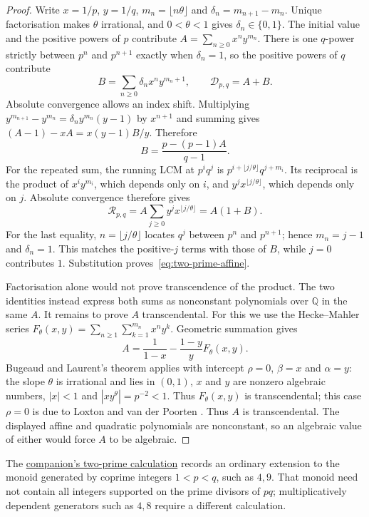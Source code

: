 \documentclass[11pt]{article}
\newcommand{\longrecord}[2]{\href{erdos269-running-lcm-reasoning-surface.pdf\##1}{#2}}
\begin{document}
\begin{proof}
Write $x=1/p$, $y=1/q$, $m_n=\lfloor n\theta\rfloor$ and
$\delta_n=m_{n+1}-m_n$.  Unique factorisation makes $\theta$ irrational,
and $0<\theta<1$ gives $\delta_n\in\{0,1\}$.  The initial value and the
positive powers of $p$ contribute $A=\sum_{n\ge0}x^ny^{m_n}$.  There is
one $q$-power strictly between $p^n$ and $p^{n+1}$ exactly when
$\delta_n=1$, so the positive powers of $q$ contribute
\[
 B=\sum_{n\ge0}\delta_nx^ny^{m_n+1},\qquad \mathcal D_{p,q}=A+B.
\]
Absolute convergence allows an index shift. Multiplying
$y^{m_{n+1}}-y^{m_n}=\delta_ny^{m_n}(y-1)$ by $x^{n+1}$ and summing gives
$(A-1)-xA=x(y-1)B/y$. Therefore
\[
 B=\frac{p-(p-1)A}{q-1}.
\]
For the repeated sum, the running LCM at $p^iq^j$ is
$p^{i+\lfloor j/\theta\rfloor}q^{j+m_i}$. Its reciprocal is the product
of $x^iy^{m_i}$, which depends only on $i$, and
$y^jx^{\lfloor j/\theta\rfloor}$, which depends only on $j$. Absolute
convergence therefore gives
\[
 \mathcal R_{p,q}
 =A\sum_{j\ge0}y^jx^{\lfloor j/\theta\rfloor}=A(1+B).
\]
For the last equality, $n=\lfloor j/\theta\rfloor$ locates $q^j$
between $p^n$ and $p^{n+1}$; hence $m_n=j-1$ and $\delta_n=1$.
This matches the positive-$j$ terms with those of $B$, while $j=0$
contributes $1$. Substitution proves~\eqref{eq:two-prime-affine}.

Factorisation alone would not prove transcendence of the product.
The two identities instead express both sums as nonconstant polynomials
over $\mathbb Q$ in the same $A$. It remains to prove $A$ transcendental.
For this we use the Hecke--Mahler series
$F_\theta(x,y)=\sum_{n\ge1}\sum_{k=1}^{m_n}x^ny^k$.
Geometric summation gives
\begin{equation}\label{eq:hecke-mahler-boundary}
 A=\frac1{1-x}-\frac{1-y}{y}F_\theta(x,y).
\end{equation}
Bugeaud and Laurent's theorem \cite[Theorem~1.1]{bugeaudlaurent2023} applies
with intercept $\rho=0$, $\beta=x$ and $\alpha=y$: the slope $\theta$ is
irrational and lies in $(0,1)$, $x$ and $y$ are nonzero algebraic numbers,
$|x|<1$ and $|xy^\theta|=p^{-2}<1$.  Thus $F_\theta(x,y)$ is transcendental;
this case $\rho=0$ is due to Loxton and van der Poorten
\cite[Theorem~8, p.~40]{loxtonvdp1977}.  Thus $A$ is transcendental.
The displayed affine and quadratic polynomials are nonconstant, so an
algebraic value of either would force $A$ to be algebraic.
\end{proof}

The \longrecord{r3-two-prime}{companion's two-prime calculation} records
an ordinary extension to the monoid generated by coprime integers
$1<p<q$, such as $4,9$. That monoid need not contain all integers
supported on the prime divisors of $pq$; multiplicatively dependent
generators such as $4,8$ require a different calculation.
\end{document}

